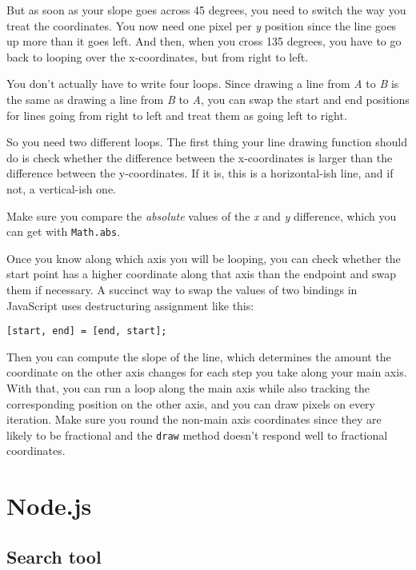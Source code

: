 But as soon as your slope goes across 45 degrees, you need to switch the way you treat the coordinates. You now need one pixel per \emph{y} position since the line goes up more than it goes left. And then, when you cross 135 degrees, you have to go back to looping over the x-coordinates, but from right to left.

You don't actually have to write four loops. Since drawing a line from \emph{A} to \emph{B} is the same as drawing a line from \emph{B} to \emph{A}, you can swap the start and end positions for lines going from right to left and treat them as going left to right.

So you need two different loops. The first thing your line drawing function should do is check whether the difference between the x-coordinates is larger than the difference between the y-coordinates. If it is, this is a horizontal-ish line, and if not, a vertical-ish one.

Make sure you compare the \emph{absolute} values of the \emph{x} and \emph{y} difference, which you can get with \lstinline`Math.abs`.

Once you know along which axis you will be looping, you can check whether the start point has a higher coordinate along that axis than the endpoint and swap them if necessary. A succinct way to swap the values of two bindings in JavaScript uses destructuring assignment like this:

\begin{lstlisting}
[start, end] = [end, start];
\end{lstlisting}
\noindent{}

Then you can compute the slope of the line, which determines the amount the coordinate on the other axis changes for each step you take along your main axis. With that, you can run a loop along the main axis while also tracking the corresponding position on the other axis, and you can draw pixels on every iteration. Make sure you round the non-main axis coordinates since they are likely to be fractional and the \lstinline`draw` method doesn't respond well to fractional coordinates.

\section{Node.js}

\subsection{Search tool}

